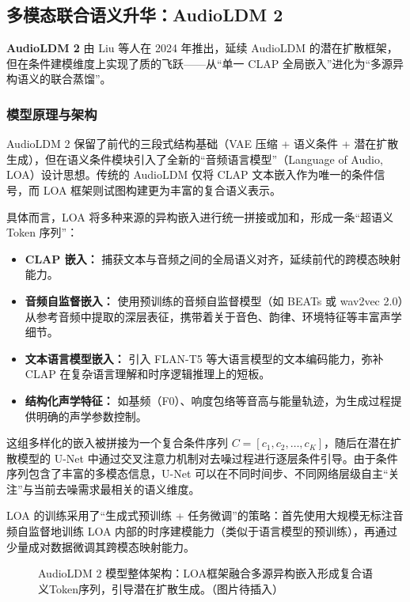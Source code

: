 \documentclass[12pt,a4paper]{article}
\begin{document}
\subsection{多模态联合语义升华：AudioLDM 2}

\textbf{AudioLDM 2} 由 Liu 等人在 2024 年推出，延续 AudioLDM 的潜在扩散框架，但在条件建模维度上实现了质的飞跃——从“单一 CLAP 全局嵌入”进化为“多源异构语义的联合蒸馏”。

\subsubsection{模型原理与架构}
AudioLDM 2 保留了前代的三段式结构基础（VAE 压缩 + 语义条件 + 潜在扩散生成），但在语义条件模块引入了全新的“音频语言模型”（Language of Audio, LOA）设计思想。传统的 AudioLDM 仅将 CLAP 文本嵌入作为唯一的条件信号，而 LOA 框架则试图构建更为丰富的复合语义表示。

具体而言，LOA 将多种来源的异构嵌入进行统一拼接或加和，形成一条“超语义 Token 序列”：
\begin{itemize}
    \item \textbf{CLAP 嵌入：} 捕获文本与音频之间的全局语义对齐，延续前代的跨模态映射能力。
    \item \textbf{音频自监督嵌入：} 使用预训练的音频自监督模型（如 BEATs 或 wav2vec 2.0）从参考音频中提取的深层表征，携带着关于音色、韵律、环境特征等丰富声学细节。
    \item \textbf{文本语言模型嵌入：} 引入 FLAN-T5 等大语言模型的文本编码能力，弥补 CLAP 在复杂语言理解和时序逻辑推理上的短板。
    \item \textbf{结构化声学特征：} 如基频（F0）、响度包络等音高与能量轨迹，为生成过程提供明确的声学参数控制。
\end{itemize}

这组多样化的嵌入被拼接为一个复合条件序列 \(C = [c_1, c_2, \dots, c_K]\)，随后在潜在扩散模型的 U-Net 中通过交叉注意力机制对去噪过程进行逐层条件引导。由于条件序列包含了丰富的多模态信息，U-Net 可以在不同时间步、不同网络层级自主“关注”与当前去噪需求最相关的语义维度。

LOA 的训练采用了“生成式预训练 + 任务微调”的策略：首先使用大规模无标注音频自监督地训练 LOA 内部的时序建模能力（类似于语言模型的预训练），再通过少量成对数据微调其跨模态映射能力。

\begin{figure}[htbp]
\centering
{}
\caption{AudioLDM 2 模型整体架构：LOA框架融合多源异构嵌入形成复合语义Token序列，引导潜在扩散生成。（图片待插入）}
\label{fig:audioldm2}
\end{figure}
\end{document}
